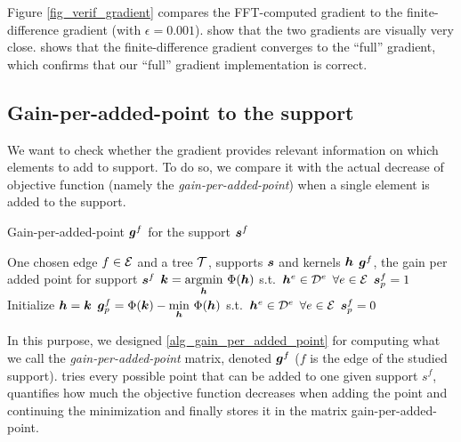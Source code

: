 \noindent
Figure \ref{fig_verif_gradient} compares the FFT-computed gradient to the finite-difference gradient (with $\epsilon=0.001$).  show that the two gradients are visually very close.  shows that the finite-difference gradient converges to the “full” gradient, which confirms that our “full” gradient implementation is correct.


\subsection{Gain-per-added-point to the support}\label{sec_gain_per_added_point}

We want to check whether the gradient provides relevant information on which elements to add to support. To do so, we compare it with the actual decrease of objective function (namely the \emph{gain-per-added-point}) when a single element is added to the support.

\begin{algorithm}[!ht]
    \caption{Gain-per-added-point $\bm{g}^f$ for the support $\bm{s}^f$}\label{alg_gain_per_added_point}
  \begin{algorithmic}[1]
    \Input One chosen edge $f \in \mathcal E$ and a tree $\mathcal T$, supports $\bm{s}$ and kernels $\bm{h}$
    \Output $\bm{g}^f$, the gain per added point for support $\bm{s}^f$
    \State $\bm{k} = \underset{\bm{h}}{\operatorname{argmin}}~ \Phi (\bm{h})$ \quad s.t.~$\bm{h}^e \in {\mathcal D}^e$ \quad $\forall e \in \mathcal E$ 
    	\State $\bm{s}^f_p = 1$ 
    	\State Initialize $\bm{h} = \bm{k}$
    	\State $\bm{g}^f_p = \Phi(\bm{k}) - \underset{\bm{h}}{\min}~ \Phi (\bm{h})$ \quad s.t.~$\bm{h}^e \in {\mathcal D}^e$ \quad $\forall e \in \mathcal E$
    	\State $\bm{s}^f_p = 0$ 
    \EndFor
  \end{algorithmic}
\end{algorithm}

\noindent
In this purpose, we designed \cref{alg_gain_per_added_point} for computing what we call the \emph{gain-per-added-point} matrix, denoted $\bm{g}^f$ ($f$ is the edge of the studied support).  tries every possible point that can be added to one given support $s^f$, quantifies how much the objective function decreases when adding the point and continuing the minimization and finally stores it in the matrix gain-per-added-point.

